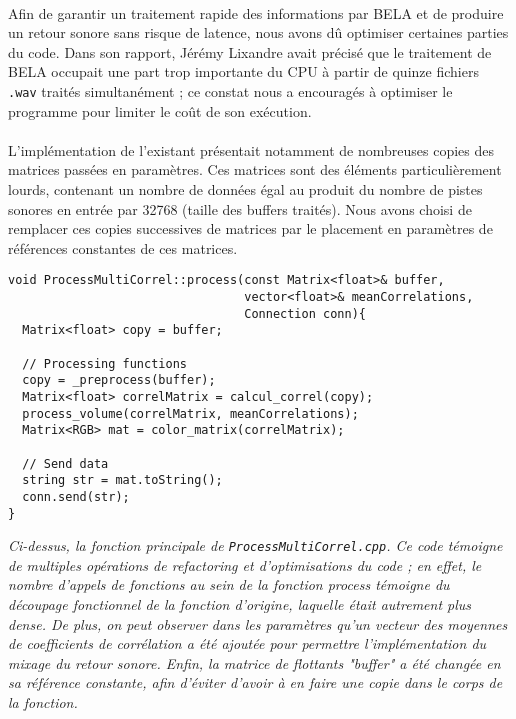 \paragraph{}
Afin de garantir un traitement rapide des informations par BELA et de
produire un retour sonore sans risque de latence, nous avons dû
optimiser certaines parties du code. Dans son rapport, Jérémy Lixandre
avait précisé que le traitement de BELA occupait une part trop
importante du CPU à partir de quinze fichiers \verb!.wav! traités
simultanément ; ce constat nous a encouragés à optimiser le programme
pour limiter le coût de son exécution.
\paragraph{}
L'implémentation de l'existant présentait notamment de nombreuses
copies des matrices passées en paramètres. Ces matrices sont des
éléments particulièrement lourds, contenant un nombre de données égal
au produit du nombre de pistes sonores en entrée par 32768 (taille des
buffers traités). Nous avons choisi de remplacer ces copies
successives de matrices par le placement en paramètres de références
constantes de ces matrices.

\begin{lstlisting}
void ProcessMultiCorrel::process(const Matrix<float>& buffer,
                                 vector<float>& meanCorrelations,
                                 Connection conn){
  Matrix<float> copy = buffer;

  // Processing functions
  copy = _preprocess(buffer);
  Matrix<float> correlMatrix = calcul_correl(copy);
  process_volume(correlMatrix, meanCorrelations);
  Matrix<RGB> mat = color_matrix(correlMatrix);

  // Send data
  string str = mat.toString();
  conn.send(str);
}
\end{lstlisting}
\begin{center}
  \textit{Ci-dessus, la fonction principale de
    \verb!ProcessMultiCorrel.cpp!. Ce code témoigne de multiples
    opérations de refactoring et d'optimisations du code ; en effet,
    le nombre d'appels de fonctions au sein de la fonction process témoigne du
    découpage fonctionnel de la fonction d'origine, laquelle était autrement
    plus dense. De plus, on peut observer dans les paramètres qu'un
    vecteur des moyennes de coefficients de corrélation a été ajoutée
    pour permettre l'implémentation du mixage du retour sonore. Enfin,
    la matrice de flottants "buffer" a été changée en sa référence
    constante, afin d'éviter d'avoir à en faire une copie dans le
    corps de la fonction.}
\end{center}

